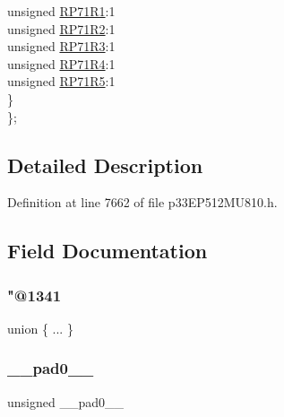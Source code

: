 \begin{DoxyCompactItemize}
\begin{tabbing}
\>\>unsigned \hyperlink{structtag_r_p_o_r3_b_i_t_s_a24405c272a934ec48698bc4b52a15f23}{RP71R1}:1\\
\>\>unsigned \hyperlink{structtag_r_p_o_r3_b_i_t_s_ae7808dfdf9d16d3414d140e61f642c39}{RP71R2}:1\\
\>\>unsigned \hyperlink{structtag_r_p_o_r3_b_i_t_s_a7b92323b8b82e0880bf6a375ccaf8bfd}{RP71R3}:1\\
\>\>unsigned \hyperlink{structtag_r_p_o_r3_b_i_t_s_a9a0dddfe26c3e7b7aae233622ad62ad5}{RP71R4}:1\\
\>\>unsigned \hyperlink{structtag_r_p_o_r3_b_i_t_s_a765dd52331db196cd5be5f7ba40be832}{RP71R5}:1\\
\>\} \\
\}; \\

\end{tabbing}\end{DoxyCompactItemize}


\subsection{Detailed Description}


Definition at line 7662 of file p33\+E\+P512\+M\+U810.\+h.



\subsection{Field Documentation}
\mbox{\label{structtag_r_p_o_r3_b_i_t_s_a907a44f4a69b187397bc5f376a88cc0e}} 
\subsubsection{\texorpdfstring{"@1341}{@1341}}
{\footnotesize\ttfamily union \{ ... \} }

\mbox{\label{structtag_r_p_o_r3_b_i_t_s_adf71f3d8410c1f1dbbc96680a92c49af}} 
\subsubsection{\texorpdfstring{\+\_\+\+\_\+pad0\+\_\+\+\_\+}{\_\_pad0\_\_}}
{\footnotesize\ttfamily unsigned \+\_\+\+\_\+pad0\+\_\+\+\_\+}




